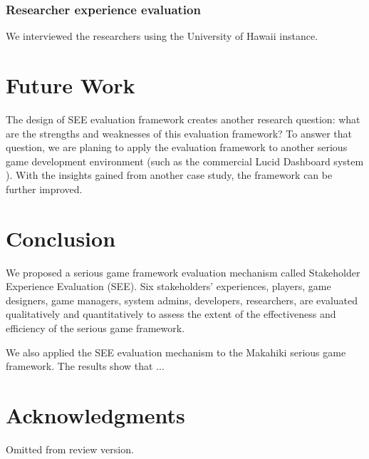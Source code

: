 \documentclass{sigchi}
\begin{document}
\subsubsection{Researcher experience evaluation}
We interviewed the researchers using the University of Hawaii instance.

\section{Future Work}
The design of SEE evaluation framework creates another research question: what are the strengths and weaknesses of this evaluation framework? To answer that question, we are planing to apply the evaluation framework to another serious game development environment (such as the commercial Lucid Dashboard system \cite{building-dashboard}). With the insights gained from another case study, the framework can be further improved.

\section{Conclusion}
We proposed a serious game framework evaluation mechanism called Stakeholder Experience Evaluation (SEE). Six stakeholders' experiences, players, game designers, game managers, system admins, developers, researchers, are evaluated qualitatively and quantitatively to assess the extent of the effectiveness and efficiency of the serious game framework.

We also applied the SEE evaluation mechanism to the Makahiki serious game framework. The results show that ...

\section{Acknowledgments}
Omitted from review version.


%
%
%
%
%
\balance



\end{document}
